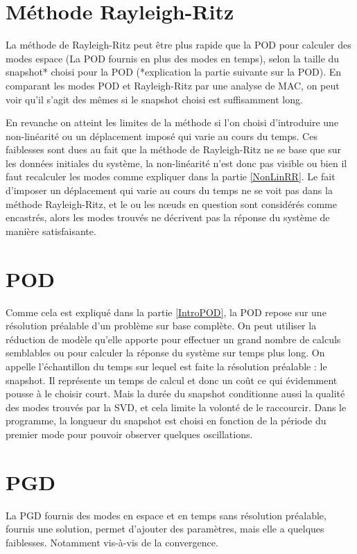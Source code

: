 \documentclass[12pt,a4paper]{report}
\begin{document}
\section{Méthode Rayleigh-Ritz}
La méthode de Rayleigh-Ritz peut être plus rapide que la POD pour calculer des modes espace (La POD fournis en plus des modes en temps), selon la taille du snapshot* choisi pour la POD (*explication la partie suivante sur la POD). En comparant les modes POD et Rayleigh-Ritz par une analyse de MAC, on peut voir qu'il s'agit des mêmes si le snapshot choisi est suffisamment long. 

En revanche on atteint les limites de la méthode si l'on choisi d'introduire une non-linéarité ou un déplacement imposé qui varie au cours du temps. Ces faiblesses sont dues au fait que la méthode de Rayleigh-Ritz ne se base que sur les données initiales du système, la non-linéarité n'est donc pas visible ou bien il faut recalculer les modes comme expliquer dans la partie \ref{NonLinRR}. Le fait d'imposer un déplacement qui varie au cours du temps ne se voit pas dans la méthode Rayleigh-Ritz, et le ou les nœuds en question sont considérés comme encastrés, alors les modes trouvés ne décrivent pas la réponse du système de manière satisfaisante.

 
\section{POD}
Comme cela est expliqué dans la partie \ref{IntroPOD}, la POD repose sur une résolution préalable d'un problème sur base complète. On peut utiliser la réduction de modèle qu'elle apporte pour effectuer un grand nombre de calculs semblables ou pour calculer la réponse du système sur temps plus long. On appelle l'échantillon du temps sur lequel est faite la résolution préalable : le snapshot. Il représente un temps de calcul et donc un coût ce qui évidemment pousse à le choisir court. Mais la durée du snapshot conditionne aussi la qualité des modes trouvés par la SVD, et cela limite la volonté de le raccourcir. Dans le programme, la longueur du snapshot est choisi en fonction de la période du premier mode pour pouvoir observer quelques oscillations.

\section{PGD}
\label{ResultatsPGD}
La PGD fournis des modes en espace et en temps sans résolution préalable, fournis une solution, permet d'ajouter des paramètres, mais elle a quelques faiblesses. Notamment vis-à-vis de la convergence.
\end{document}

